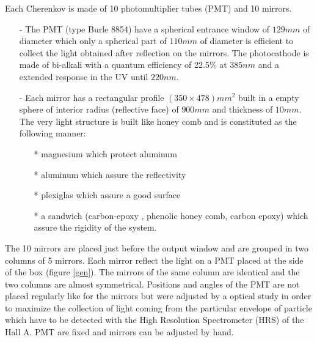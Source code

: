 \documentclass[12pt]{article}
\begin{document}
Each Cherenkov is made of 10 photomultiplier tubes (PMT) and 10 mirrors.
\begin{itemize}
\item[-] The PMT (type Burle 8854) have a spherical entrance window of
$129mm$ of diameter which only a spherical part of $110mm$ of diameter is
efficient to collect the light obtained after reflection on the mirrors. 
The photocathode is made of bi-alkali with a quantum efficiency of 22.5\% 
at $385nm$ and a extended response in the UV until $220 nm$.
\item[-] Each mirror has a rectangular profile $(350 \times 478) mm^2$
built in a empty sphere of interior radius (reflective face) 
of $900mm$ and thickness of $10mm$. The very light structure is built
like honey comb and is constituted as the following manner:
\begin{itemize}
\item[*] magnesium which protect aluminum
\item[*] aluminum which assure the reflectivity
\item[*] plexiglas which assure a good surface 
\item[*] a sandwich (carbon-epoxy , phenolic honey comb, carbon epoxy) which
assure the rigidity of the system.
\end{itemize}
\end{itemize}
The 10 mirrors are placed just before the output window and are grouped in
two columns of 5 mirrors. Each mirror reflect the light on a PMT placed at the
side of the box (figure \ref{gen}). The mirrors of the same column are
identical and the two
columns are almost symmetrical. Positions and angles of the PMT are not placed
regularly like for the mirrors but were adjusted by a optical study in order to
maximize the collection of light coming from the particular envelope of
particle which have to be detected with the High Resolution Spectrometer
(HRS) of the Hall A. PMT are fixed and mirrors can
be adjusted by hand.
\end{document}

